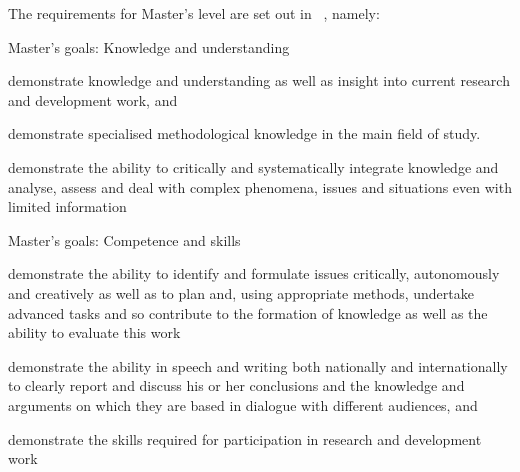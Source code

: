 The requirements for Master's level are set out in 
~\autocite{HEO2}, namely:
  \begin{block}{Master's goals: Knowledge and understanding~\autocite{HEO2}}
      \item\label{K1} demonstrate knowledge and understanding \textelp{} as 
        well as insight into current research and development work, and
      \item\label{K2} demonstrate specialised methodological knowledge in the 
        main field of study.
      \item\label{K3} demonstrate the ability to critically and systematically 
        integrate knowledge and analyse, assess and deal with complex 
        phenomena, issues and situations even with limited information
  \end{block}

  \begin{block}{Master's goals: Competence and skills~\autocite{HEO2}}
      \item\label{C1} demonstrate the ability to identify and formulate issues 
        critically, autonomously and creatively as well as to plan and, using 
        appropriate methods, undertake advanced tasks
        and so contribute to the formation of knowledge as well as the ability 
        to evaluate this work
      \item\label{Ccomm} demonstrate the ability in speech and writing both 
        nationally and internationally to clearly report and discuss his or her 
        conclusions and the knowledge and arguments on which they are based in 
        dialogue with different audiences, and
      \item\label{C2} demonstrate the skills required for participation in 
        research and development work \textelp{}
  \end{block}

